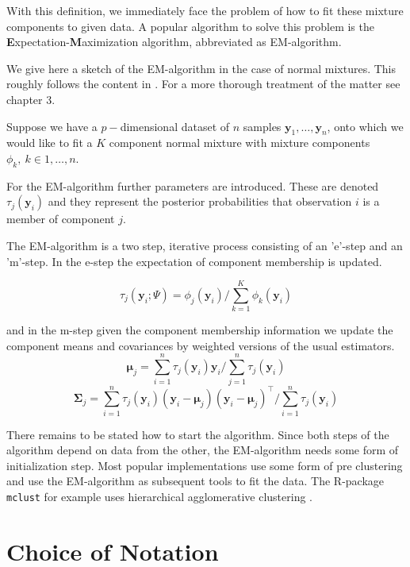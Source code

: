 With this definition, we immediately face the problem of how to fit these
mixture components to given data. A popular algorithm to solve this problem 
is the {\bf E}xpectation-{\bf M}aximization algorithm, abbreviated as 
EM-algorithm.

We give here a sketch of the EM-algorithm in the case of normal mixtures. This 
roughly follows the content in \cite{McL00}. For a more thorough treatment of 
the matter see chapter 3.

Suppose we have a $p-$dimensional dataset of $n$ samples $\pmb{y}_1, \dots ,\pmb{y}_n$,
onto which we would like to fit a $K$ component normal mixture with mixture
components $\phi_k,\ k \in {1,\dots , n}$. 

For the EM-algorithm further parameters are introduced. These are denoted
$\tau_j(\pmb{y}_i)$ and they represent the posterior probabilities that 
observation $i$ is a member of component $j$.

The EM-algorithm is a two step, iterative process consisting of an 'e'-step
and an 'm'-step.
In the e-step the expectation of component membership is updated.

\begin{equation} 
    \tau_j(\pmb{y}_i;\Psi) = \phi_j(\pmb{y}_i)/ \sum_{k=1}^K \phi_k(\pmb{y}_i)
\end{equation}

and in the m-step given the component membership information we update the 
component means and covariances by weighted versions of the usual estimators.
\begin{equation}
    \pmb{\mu}_j = \sum_{i=1}^n \tau_j(\pmb{y}_i)\pmb{y}_i / \sum_{j=1}^n \tau_j(\pmb{y}_i)
\end{equation}
\begin{equation}
    \pmb{\Sigma}_j = \sum_{i=1}^n \tau_j(\pmb{y}_i) (\pmb{y}_i- \pmb{\mu}_j)(\pmb{y}_i-\pmb{\mu}_j)^\top /  \sum_{i=1}^n \tau_j(\pmb{y}_i)
\end{equation}

There remains to be stated how to start the algorithm. Since both steps of the
algorithm depend on data from the other, the EM-algorithm needs some form of 
initialization step.
Most popular implementations use some form of pre clustering and use the 
EM-algorithm as subsequent tools to fit the data. The R-package {\tt mclust} 
for example uses hierarchical agglomerative clustering \cite{Scr16}.


\section{Choice of Notation}
\label{sec:notation}

